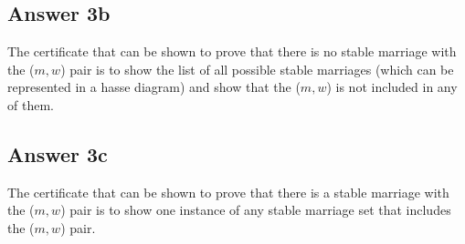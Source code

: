 \documentclass[twoside]{article}
\begin{document}
\subsection{Answer 3b}

The certificate that can be shown to prove that there is no stable marriage with the ($m, w$) pair is to show the list of all possible stable marriages (which can be represented in a hasse diagram) and show that the ($m, w$) is not included in any of them. \\  

\subsection{Answer 3c}

The certificate that can be shown to prove that there is a stable marriage with the ($m, w$) pair is to show one instance of any stable marriage set that includes the ($m, w$) pair. 
\end{document}
